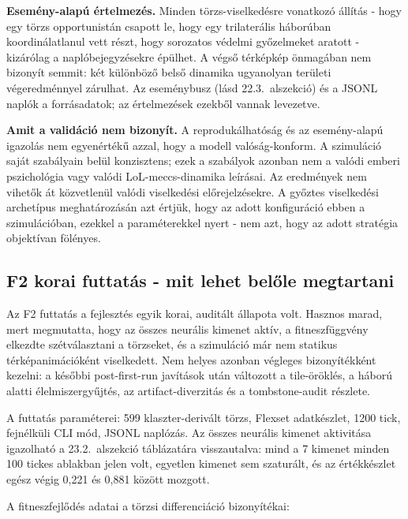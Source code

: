 \textbf{Esemény-alapú értelmezés.} Minden törzs-viselkedésre vonatkozó állítás - hogy egy törzs opportunistán csapott le, hogy egy trilaterális háborúban koordinálatlanul vett részt, hogy sorozatos védelmi győzelmeket aratott - kizárólag a naplóbejegyzésekre épülhet. A végső térképkép önmagában nem bizonyít semmit: két különböző belső dinamika ugyanolyan területi végeredménnyel zárulhat. Az eseménybusz (lásd 22.3.~alszekció) és a JSONL naplók a forrásadatok; az értelmezések ezekből vannak levezetve.

\textbf{Amit a validáció nem bizonyít.} A reprodukálhatóság és az esemény-alapú igazolás nem egyenértékű azzal, hogy a modell valóság-konform. A szimuláció saját szabályain belül konzisztens; ezek a szabályok azonban nem a valódi emberi pszichológia vagy valódi LoL-meccs-dinamika leírásai. Az eredmények nem vihetők át közvetlenül valódi viselkedési előrejelzésekre. A győztes viselkedési archetípus meghatározásán azt értjük, hogy az adott konfiguráció ebben a szimulációban, ezekkel a paraméterekkel nyert - nem azt, hogy az adott stratégia objektívan fölényes.

\subsection*{F2 korai futtatás - mit lehet belőle megtartani}

Az F2 futtatás a fejlesztés egyik korai, auditált állapota volt. Hasznos marad,
mert megmutatta, hogy az összes neurális kimenet aktív, a fitneszfüggvény elkezdte
szétválasztani a törzseket, és a szimuláció már nem statikus térképanimációként
viselkedett. Nem helyes azonban végleges bizonyítékként kezelni: a későbbi
post-first-run javítások után változott a tile-öröklés, a háború alatti
élelmiszergyűjtés, az artifact-diverzitás és a tombstone-audit részlete.

A futtatás paraméterei: 599 klaszter-derivált törzs, Flexset adatkészlet, 1200 tick, fejnélküli CLI mód, JSONL naplózás. Az összes neurális kimenet aktivitása igazolható a 23.2.~alszekció táblázatára visszautalva: mind a 7 kimenet minden 100 tickes ablakban jelen volt, egyetlen kimenet sem szaturált, és az értékkészlet egész végig 0,221 és 0,881 között mozgott.

A fitneszfejlődés adatai a törzsi differenciáció bizonyítékai:

